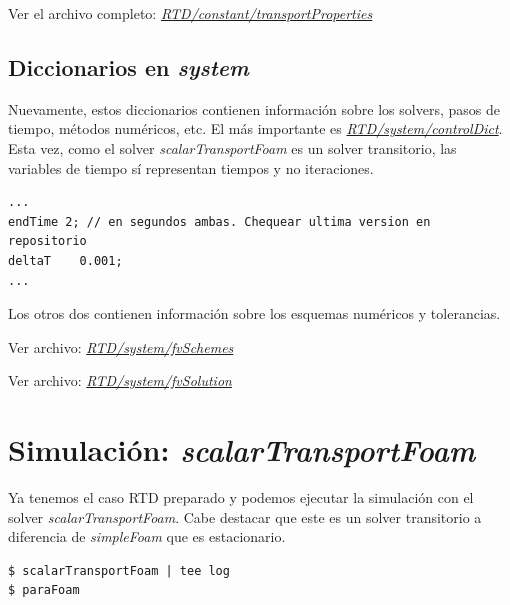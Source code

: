 \documentclass{article}
\begin{document}
Ver el archivo completo: \textit{\href{https://github.com/guillerolle/adscripcion_cfd/blob/master/01/RTD/constant/transportProperties}{RTD/constant/transportProperties}}

%


\subsection{Diccionarios en \textit{system}}
Nuevamente, estos diccionarios contienen información sobre los solvers, pasos de tiempo, métodos numéricos, etc.
El más importante es \textit{\href{https://github.com/guillerolle/adscripcion_cfd/blob/master/01/RTD/system/controlDict}{RTD/system/controlDict}}.  Esta vez, como el solver \textit{scalarTransportFoam} es un solver transitorio, las variables de tiempo sí representan tiempos y no iteraciones.

\begin{lstlisting}
...
endTime 2; // en segundos ambas. Chequear ultima version en repositorio
deltaT 	  0.001;  
...
\end{lstlisting}

Los otros dos contienen información sobre los esquemas numéricos y tolerancias.\par
Ver archivo: \textit{\href{https://github.com/guillerolle/adscripcion_cfd/blob/master/01/RTD/system/fvSchemes}{RTD/system/fvSchemes}}\par
Ver archivo:
\textit{\href{https://github.com/guillerolle/adscripcion_cfd/blob/master/01/RTD/system/fvSolution}{RTD/system/fvSolution}}


%
%
%

\section{Simulación: \textit{scalarTransportFoam}}
Ya tenemos el caso RTD preparado y podemos ejecutar la simulación con el solver \textit{scalarTransportFoam}. Cabe destacar que este es un solver transitorio a diferencia de \textit{simpleFoam} que es estacionario.

\begin{lstlisting}
$ scalarTransportFoam | tee log
$ paraFoam
\end{lstlisting}
\end{document}
